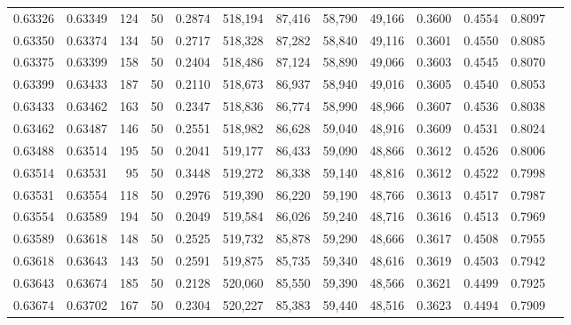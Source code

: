 \begin{tabular}{rrrrrrrrrrrrr}
0.63326 & 0.63349 &   124 &  50 &                                     0.2874 & 518,194 &  87,416 &  58,790 &  49,166 & 0.3600 & 0.4554 & 0.8097 \\
0.63350 & 0.63374 &   134 &  50 &                                     0.2717 & 518,328 &  87,282 &  58,840 &  49,116 & 0.3601 & 0.4550 & 0.8085 \\
0.63375 & 0.63399 &   158 &  50 &                                     0.2404 & 518,486 &  87,124 &  58,890 &  49,066 & 0.3603 & 0.4545 & 0.8070 \\
0.63399 & 0.63433 &   187 &  50 &                                     0.2110 & 518,673 &  86,937 &  58,940 &  49,016 & 0.3605 & 0.4540 & 0.8053 \\
0.63433 & 0.63462 &   163 &  50 &                                     0.2347 & 518,836 &  86,774 &  58,990 &  48,966 & 0.3607 & 0.4536 & 0.8038 \\
0.63462 & 0.63487 &   146 &  50 &                                     0.2551 & 518,982 &  86,628 &  59,040 &  48,916 & 0.3609 & 0.4531 & 0.8024 \\
0.63488 & 0.63514 &   195 &  50 &                                     0.2041 & 519,177 &  86,433 &  59,090 &  48,866 & 0.3612 & 0.4526 & 0.8006 \\
0.63514 & 0.63531 &    95 &  50 &                                     0.3448 & 519,272 &  86,338 &  59,140 &  48,816 & 0.3612 & 0.4522 & 0.7998 \\
0.63531 & 0.63554 &   118 &  50 &                                     0.2976 & 519,390 &  86,220 &  59,190 &  48,766 & 0.3613 & 0.4517 & 0.7987 \\
0.63554 & 0.63589 &   194 &  50 &                                     0.2049 & 519,584 &  86,026 &  59,240 &  48,716 & 0.3616 & 0.4513 & 0.7969 \\
0.63589 & 0.63618 &   148 &  50 &                                     0.2525 & 519,732 &  85,878 &  59,290 &  48,666 & 0.3617 & 0.4508 & 0.7955 \\
0.63618 & 0.63643 &   143 &  50 &                                     0.2591 & 519,875 &  85,735 &  59,340 &  48,616 & 0.3619 & 0.4503 & 0.7942 \\
0.63643 & 0.63674 &   185 &  50 &                                     0.2128 & 520,060 &  85,550 &  59,390 &  48,566 & 0.3621 & 0.4499 & 0.7925 \\
0.63674 & 0.63702 &   167 &  50 &                                     0.2304 & 520,227 &  85,383 &  59,440 &  48,516 & 0.3623 & 0.4494 & 0.7909 \\

\end{tabular}

